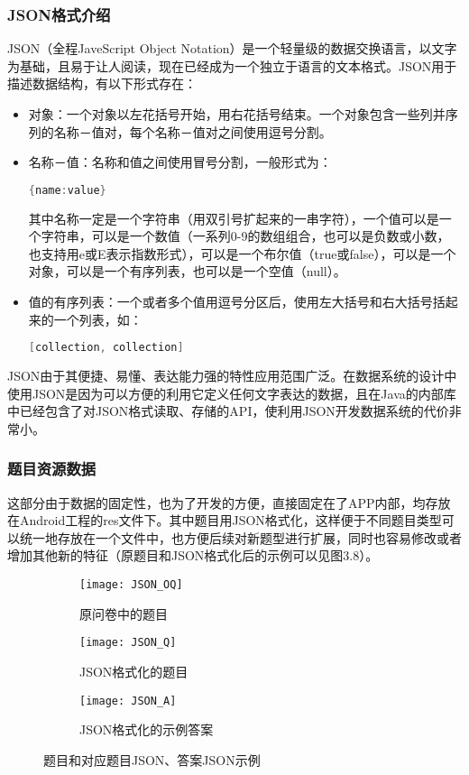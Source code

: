 \subsubsection{JSON格式介绍}

JSON（全程JaveScript Object Notation）是一个轻量级的数据交换语言，以文字为基础，且易于让人阅读，现在已经成为一个独立于语言的文本格式。JSON用于描述数据结构，有以下形式存在：

\begin{itemize}
\item 对象：一个对象以左花括号开始，用右花括号结束。一个对象包含一些列并序列的名称－值对，每个名称－值对之间使用逗号分割。
\item 名称－值：名称和值之间使用冒号分割，一般形式为：
\begin{lstlisting}[language=JAVA]
{name:value}
\end{lstlisting}
其中名称一定是一个字符串（用双引号扩起来的一串字符），一个值可以是一个字符串，可以是一个数值（一系列0-9的数组组合，也可以是负数或小数，也支持用e或E表示指数形式），可以是一个布尔值（true或false），可以是一个对象，可以是一个有序列表，也可以是一个空值（null）。
\item 值的有序列表：一个或者多个值用逗号分区后，使用左大括号和右大括号括起来的一个列表，如：
\begin{lstlisting}[language=JAVA]
[collection, collection]
\end{lstlisting}
\end{itemize}

JSON由于其便捷、易懂、表达能力强的特性应用范围广泛。在数据系统的设计中使用JSON是因为可以方便的利用它定义任何文字表达的数据，且在Java的内部库中已经包含了对JSON格式读取、存储的API，使利用JSON开发数据系统的代价非常小。

\subsubsection{题目资源数据}

这部分由于数据的固定性，也为了开发的方便，直接固定在了APP内部，均存放在Android工程的res文件下。其中题目用JSON格式化，这样便于不同题目类型可以统一地存放在一个文件中，也方便后续对新题型进行扩展，同时也容易修改或者增加其他新的特征（原题目和JSON格式化后的示例可以见图3.8）。

\begin{figure}[h]
\centering%
\begin{subfigure}{13cm}
\texttt{[image: JSON\_OQ]}
\caption{原问卷中的题目}
\end{subfigure}
\begin{subfigure}{6cm}
\texttt{[image: JSON\_Q]}
\caption{JSON格式化的题目}
\end{subfigure}
\hspace{4em}%
\begin{subfigure}{6cm}
\texttt{[image: JSON\_A]}
\caption{JSON格式化的示例答案}
\end{subfigure}
\caption{题目和对应题目JSON、答案JSON示例}
\label{fig:big1-subfigure}
\end{figure}

